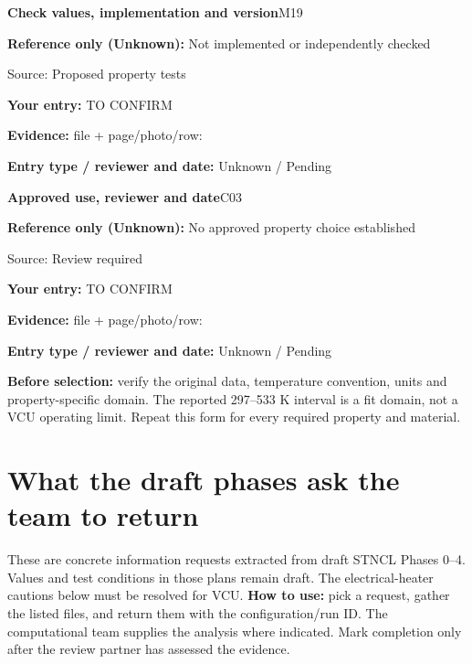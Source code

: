 \documentclass[11pt]{article}
\newcommand{\notebox}[1]{\par\noindent\colorbox{amber}{\parbox{\dimexpr\linewidth-2\fboxsep\relax}{#1}}\par}
\begin{document}
\begin{minipage}{\textwidth}\small
{\color{navy}\bfseries Check values, implementation and version}\hfill M19\par
\colorbox{pale}{\parbox{\dimexpr\linewidth-2\fboxsep\relax}{
\textbf{Reference only (Unknown):} Not implemented or independently checked\par
{\footnotesize Source: Proposed property tests}}}\par
\textbf{Your entry:} {\color{muted}TO CONFIRM}\enspace\hrulefill\par
{\footnotesize\textbf{Evidence:} file + page/photo/row: \hrulefill\par
\textbf{Entry type / reviewer and date:} Unknown / Pending\par
}\end{minipage}\par\vspace{5pt}
\begin{minipage}{\textwidth}\small
{\color{navy}\bfseries Approved use, reviewer and date}\hfill C03\par
\colorbox{pale}{\parbox{\dimexpr\linewidth-2\fboxsep\relax}{
\textbf{Reference only (Unknown):} No approved property choice established\par
{\footnotesize Source: Review required}}}\par
\textbf{Your entry:} {\color{muted}TO CONFIRM}\enspace\hrulefill\par
{\footnotesize\textbf{Evidence:} file + page/photo/row: \hrulefill\par
\textbf{Entry type / reviewer and date:} Unknown / Pending\par
}\end{minipage}\par\vspace{5pt}
\notebox{\textbf{Before selection:} verify the original data, temperature convention, units and property-specific domain. The reported 297--533 K interval is a fit domain, not a VCU operating limit. Repeat this form for every required property and material.}
\clearpage\section{What the draft phases ask the team to return}\label{phase-requests}
These are concrete information requests extracted from draft STNCL Phases 0--4. Values and test conditions in those plans remain draft. The electrical-heater cautions below must be resolved for VCU.
\textbf{How to use:} pick a request, gather the listed files, and return them with the configuration/run ID. The computational team supplies the analysis where indicated. Mark completion only after the review partner has assessed the evidence.
\end{document}
